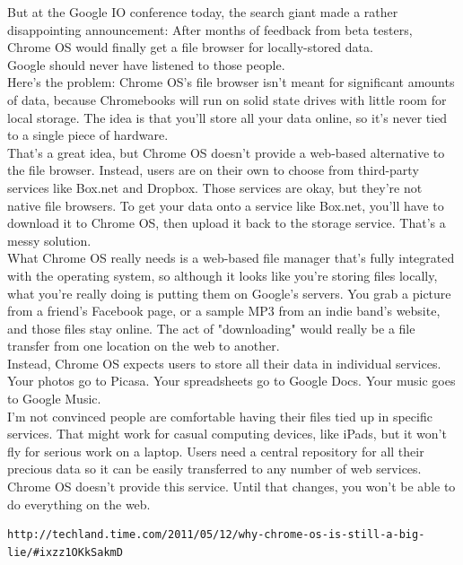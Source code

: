 \documentclass{article}
\begin{document}
		But at the Google IO conference today, the search giant made a rather disappointing announcement: After months of feedback from beta testers, Chrome OS would finally get a file browser for locally-stored data.\\

		Google should never have listened to those people.\\

		Here's the problem: Chrome OS's file browser isn't meant for significant amounts of data, because Chromebooks will run on solid state drives with little room for local storage. The idea is that you'll store all your data online, so it's never tied to a single piece of hardware.\\

		That's a great idea, but Chrome OS doesn't provide a web-based alternative to the file browser. Instead, users are on their own to choose from third-party services like Box.net and Dropbox. Those services are okay, but they're not native file browsers. To get your data onto a service like Box.net, you'll have to download it to Chrome OS, then upload it back to the storage service. That's a messy solution.\\

		What Chrome OS really needs is a web-based file manager that's fully integrated with the operating system, so although it looks like you're storing files locally, what you're really doing is putting them on Google's servers. You grab a picture from a friend's Facebook page, or a sample MP3 from an indie band's website, and those files stay online. The act of "downloading" would really be a file transfer from one location on the web to another.\\

		Instead, Chrome OS expects users to store all their data in individual services. Your photos go to Picasa. Your spreadsheets go to Google Docs. Your music goes to Google Music.\\

		I'm not convinced people are comfortable having their files tied up in specific services. That might work for casual computing devices, like iPads, but it won't fly for serious work on a laptop. Users need a central repository for all their precious data so it can be easily transferred to any number of web services. Chrome OS doesn't provide this service. Until that changes, you won't be able to do everything on the web.
		\begin{verbatim}http://techland.time.com/2011/05/12/why-chrome-os-is-still-a-big-lie/#ixzz1OKkSakmD \end{verbatim}
\end{document}
